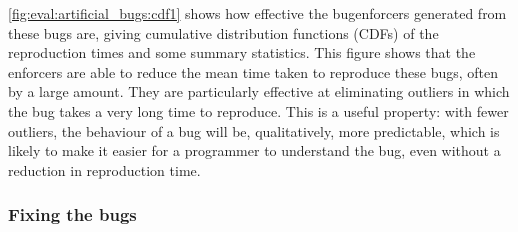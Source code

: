 \noindent
\autoref{fig:eval:artificial_bugs:cdf1} shows how effective the
\glspl{bugenforcer} generated from these bugs are, giving cumulative
distribution functions (CDFs) of the reproduction times and some
summary statistics.  This figure shows that the enforcers are able to
reduce the mean time taken to reproduce these bugs, often by a large
amount.  They are particularly effective at eliminating outliers in
which the bug takes a very long time to reproduce.  This is a useful
property: with fewer outliers, the behaviour of a bug will be,
qualitatively, more predictable, which is likely to make it easier for
a programmer to understand the bug, even without a reduction in
reproduction time.

\subsubsection{Fixing the bugs}

